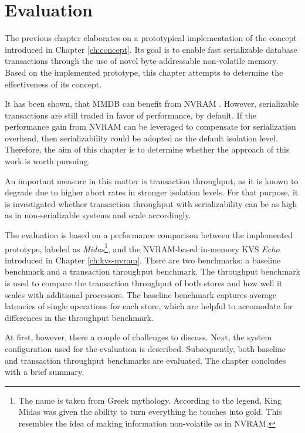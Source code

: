 \chapter{Evaluation}
\label{ch:eval}

The previous chapter elaborates on a prototypical implementation of the concept
introduced in Chapter \ref{ch:concept}. Its goal is to enable fast serializable
database transactions through the use of novel byte-addressable non-volatile
memory. Based on the implemented prototype, this chapter attempts to determine
the effectiveness of its concept.

It has been shown, that MMDB can benefit from NVRAM \cite{bailey2013exploring,
schwalb2016hyrise, oukid2017data, andrei2017sap}. However, serializable
transactions are still traded in favor of performance, by default. If the
performance gain from NVRAM can be leveraged to compensate for serialization
overhead, then serializability could be adopted as the default isolation level.
Therefore, the aim of this chapter is to determine whether the approach of this
work is worth pursuing.

An important measure in this matter is transaction throughput, as it is known to
degrade due to higher abort rates in stronger isolation levels. For that purpose,
it is investigated whether transaction throughput with serializability can be as
high as in non-serializable systems and scale accordingly.

The evaluation is based on a performance comparison between the implemented
prototype, labeled as \emph{Midas}\footnote{The name is taken from Greek
mythology. According to the legend, King Midas was given the ability to turn
everything he touches into gold. This resembles the idea of making information
non-volatile as in NVRAM.}, and the NVRAM-based in-memory KVS \emph{Echo}
introduced in Chapter \ref{ch:kvs-nvram}. There are two benchmarks: a baseline
benchmark and a transaction throughput benchmark. The throughput benchmark is
used to compare the transaction throughput of both stores and how well it scales
with additional processors. The baseline benchmark captures average latencies of
single operations for each store, which are helpful to accomodate for
differences in the throughput benchmark.

At first, however, there a couple of challenges to discuss. Next, the system
configuration used for the evaluation is described. Subsequently, both baseline
and transaction throughput benchmarks are evaluated. The chapter concludes with
a brief summary.

